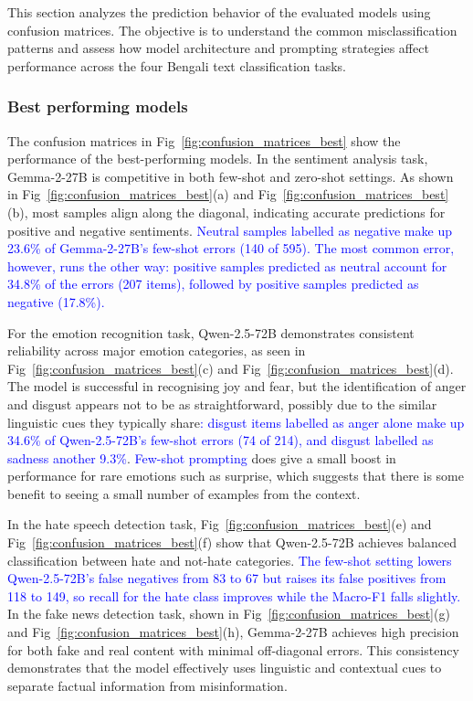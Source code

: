 \documentclass[10pt,letterpaper]{article}
\newcommand{\rev}[1]{\textcolor{blue}{#1}}
\begin{document}
This section analyzes the prediction behavior of the evaluated models using confusion matrices. The objective is to understand the common misclassification patterns and assess how model architecture and prompting strategies affect performance across the four Bengali text classification tasks.

\subsubsection*{Best performing models}
\label{sec:best_performing_models}

The confusion matrices in Fig~\ref{fig:confusion_matrices_best} show the performance of the best-performing models. In the sentiment analysis task, Gemma-2-27B is competitive in both few-shot and zero-shot settings. As shown in Fig~\ref{fig:confusion_matrices_best}(a) and Fig~\ref{fig:confusion_matrices_best}(b), most samples align along the diagonal, indicating accurate predictions for positive and negative sentiments. \rev{Neutral samples labelled as negative make up 23.6\% of Gemma-2-27B's few-shot errors (140 of 595). The most common error, however, runs the other way: positive samples predicted as neutral account for 34.8\% of the errors (207 items), followed by positive samples predicted as negative (17.8\%).}

For the emotion recognition task, Qwen-2.5-72B demonstrates consistent reliability across major emotion categories, as seen in Fig~\ref{fig:confusion_matrices_best}(c) and Fig~\ref{fig:confusion_matrices_best}(d). The model is successful in recognising joy and fear, but the identification of anger and disgust appears not to be as straightforward, possibly due to the similar linguistic cues they typically share\rev{: disgust items labelled as anger alone make up 34.6\% of Qwen-2.5-72B's few-shot errors (74 of 214), and disgust labelled as sadness another 9.3\%}. \rev{Few-shot prompting} does give a small boost in performance for rare emotions such as surprise, which suggests that there is some benefit to seeing a small number of examples from the context.

In the hate speech detection task, Fig~\ref{fig:confusion_matrices_best}(e) and Fig~\ref{fig:confusion_matrices_best}(f) show that Qwen-2.5-72B achieves balanced classification between hate and not-hate categories. \rev{The few-shot setting lowers Qwen-2.5-72B's false negatives from 83 to 67 but raises its false positives from 118 to 149, so recall for the hate class improves while the Macro-F1 falls slightly.} In the fake news detection task, shown in Fig~\ref{fig:confusion_matrices_best}(g) and Fig~\ref{fig:confusion_matrices_best}(h), Gemma-2-27B achieves high precision for both fake and real content with minimal off-diagonal errors. This consistency demonstrates that the model effectively uses linguistic and contextual cues to separate factual information from misinformation.
\end{document}
